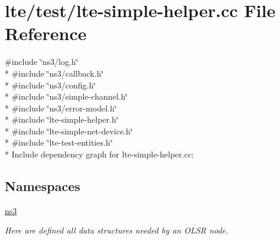 \hypertarget{lte-simple-helper_8cc}{}\section{lte/test/lte-\/simple-\/helper.cc File Reference}
\label{lte-simple-helper_8cc}
{\ttfamily \#include \char`\"{}ns3/log.\+h\char`\"{}}\\*
{\ttfamily \#include \char`\"{}ns3/callback.\+h\char`\"{}}\\*
{\ttfamily \#include \char`\"{}ns3/config.\+h\char`\"{}}\\*
{\ttfamily \#include \char`\"{}ns3/simple-\/channel.\+h\char`\"{}}\\*
{\ttfamily \#include \char`\"{}ns3/error-\/model.\+h\char`\"{}}\\*
{\ttfamily \#include \char`\"{}lte-\/simple-\/helper.\+h\char`\"{}}\\*
{\ttfamily \#include \char`\"{}lte-\/simple-\/net-\/device.\+h\char`\"{}}\\*
{\ttfamily \#include \char`\"{}lte-\/test-\/entities.\+h\char`\"{}}\\*
Include dependency graph for lte-\/simple-\/helper.cc\+:
\subsection*{Namespaces}
\begin{DoxyCompactItemize}
\item 
 \hyperlink{namespacens3}{ns3}
\begin{DoxyCompactList}\small\item\em Here are defined all data structures needed by an O\+L\+SR node. \end{DoxyCompactList}\end{DoxyCompactItemize}
